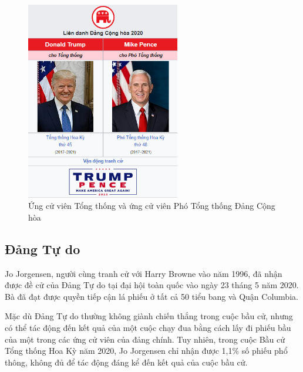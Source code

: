 \documentclass[14pt, a4paper]{article}
\numberwithin{equation}{section}
\numberwithin{figure}{section}
\numberwithin{dl}{section}
\numberwithin{md}{section}
\numberwithin{bd}{section}
\numberwithin{dn}{section}
\numberwithin{hq}{section}
\begin{document}
    \begin{figure}[h!]
        \centering
        \includegraphics[width=0.6\textwidth]{Rep_Candidates.png}
        \caption{Ứng cử viên Tổng thống và ứng cử viên Phó Tổng thống Đảng Cộng hòa}
    \end{figure}

    \subsection{Đảng Tự do}

    Jo Jorgensen, người cùng tranh cử với Harry Browne vào năm 1996, đã nhận được đề cử của Đảng Tự do tại đại hội toàn quốc vào ngày 23 tháng 5 năm 2020.
    Bà đã đạt được quyền tiếp cận lá phiếu ở tất cả 50 tiểu bang và Quận Columbia.

    Mặc dù Đảng Tự do thường không giành chiến thắng trong cuộc bầu cử, nhưng có thể tác động đến kết quả của một cuộc chạy đua bằng cách lấy đi phiếu bầu của một trong các ứng cử viên của đảng chính. 
    Tuy nhiên, trong cuộc Bầu cử Tổng thống Hoa Kỳ năm 2020, Jo Jorgensen chỉ nhận được 1,1\% số phiếu phổ thông, không đủ để tác động đáng kể đến kết quả của cuộc bầu cử.
\end{document}
